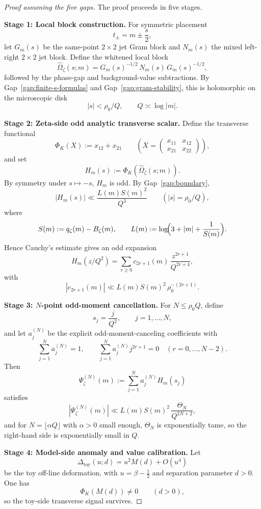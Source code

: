 \documentclass[11pt]{article}
\newcommand{\Om}{\Omega}
\newcommand{\toy}{\mathrm{toy}}
\newcommand{\zetaSide}{\zeta}
\begin{document}
\begin{proof}[Proof assuming the five gaps]
The proof proceeds in five stages.

\medskip
\noindent
\textbf{Stage 1: Local block construction.}
For symmetric placement
\[
t_\pm = m \pm \frac{s}{2},
\]
let $G_m(s)$ be the same-point $2\times 2$ jet Gram block and $N_m(s)$ the
mixed left-right $2\times 2$ jet block. Define the whitened local block
\[
\widehat{\Om}_{\zetaSide}(s;m)
=
G_m(s)^{-1/2}\,N_m(s)\,G_m(s)^{-1/2},
\]
followed by the phase-gap and background-value subtractions.
By Gap~\ref{gap:finite-s-formulas} and Gap~\ref{gap:gram-stability},
this is holomorphic on the microscopic disk
\[
|s|<\rho_0/Q,
\qquad Q \asymp \log |m|.
\]

\medskip
\noindent
\textbf{Stage 2: Zeta-side odd analytic transverse scalar.}
Define the transverse functional
\[
\Phi_K(X):=x_{12}+x_{21}
\qquad
\left(
X=
\begin{pmatrix}
x_{11}&x_{12}\\
x_{21}&x_{22}
\end{pmatrix}
\right),
\]
and set
\[
H_m(s):=\Phi_K(\widehat{\Om}_{\zetaSide}(s;m)).
\]
By symmetry under $s\mapsto -s$, $H_m$ is odd. By Gap~\ref{gap:boundary},
\[
|H_m(s)| \ll \frac{L(m)S(m)^2}{Q^3}
\qquad (|s|=\rho_0/Q),
\]
where
\[
S(m):=q_\zeta(m)-B_\zeta(m),
\qquad
L(m):=\log\!\Bigl(3+|m|+\frac1{S(m)}\Bigr).
\]
Hence Cauchy's estimate gives an odd expansion
\[
H_m(z/Q^2)
=
\sum_{r\ge 0} c_{2r+1}(m)\,\frac{z^{2r+1}}{Q^{2r+4}},
\]
with
\[
|c_{2r+1}(m)| \ll L(m)S(m)^2\,\rho_0^{-(2r+1)}.
\]

\medskip
\noindent
\textbf{Stage 3: $N$-point odd-moment cancellation.}
For $N\le \rho_0 Q$, define
\[
s_j=\frac{j}{Q^2},
\qquad
j=1,\dots,N,
\]
and let $a_j^{(N)}$ be the explicit odd-moment-canceling coefficients with
\[
\sum_{j=1}^N a_j^{(N)}=1,
\qquad
\sum_{j=1}^N a_j^{(N)}j^{2r+1}=0
\quad (r=0,\dots,N-2).
\]
Then
\[
\Psi^{(N)}_{\zetaSide}(m)
:=
\sum_{j=1}^N a_j^{(N)} H_m(s_j)
\]
satisfies
\[
|\Psi^{(N)}_{\zetaSide}(m)|
\ll
L(m)S(m)^2\,\frac{\Theta_N}{Q^{2N+2}},
\]
and for $N=\lfloor \alpha Q\rfloor$ with $\alpha>0$ small enough, $\Theta_N$
is exponentially tame, so the right-hand side is exponentially small in $Q$.

\medskip
\noindent
\textbf{Stage 4: Model-side anomaly and value calibration.}
Let
\[
\Delta_{\toy}(u;d)=u^2 M(d)+O(u^4)
\]
be the toy off-line deformation, with $u=\beta-\tfrac12$ and separation
parameter $d>0$. One has
\[
\Phi_K(M(d))\neq 0
\qquad(d>0),
\]
so the toy-side transverse signal survives.


\end{proof}
\end{document}
